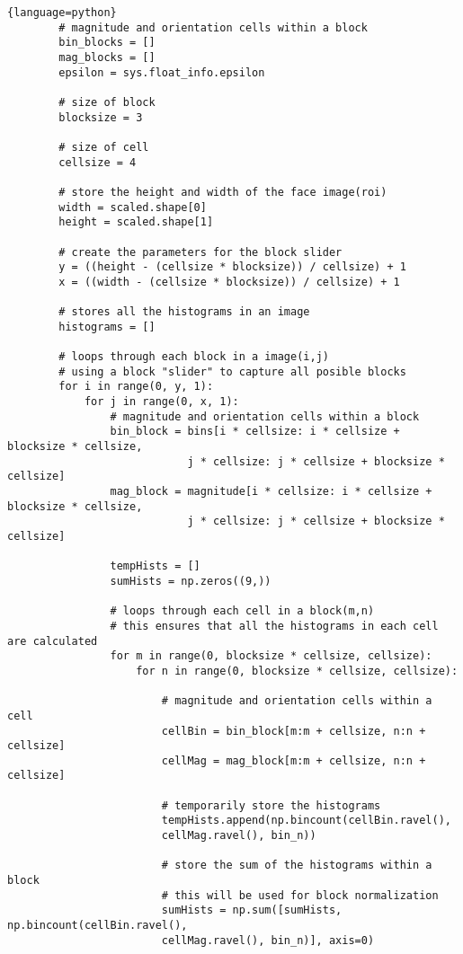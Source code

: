 \begin{lstlisting}{language=python}
        # magnitude and orientation cells within a block
        bin_blocks = []
        mag_blocks = []
        epsilon = sys.float_info.epsilon

        # size of block
        blocksize = 3 
		
        # size of cell
        cellsize = 4

        # store the height and width of the face image(roi)
        width = scaled.shape[0]
        height = scaled.shape[1]

        # create the parameters for the block slider
        y = ((height - (cellsize * blocksize)) / cellsize) + 1
        x = ((width - (cellsize * blocksize)) / cellsize) + 1

        # stores all the histograms in an image
        histograms = []
		
        # loops through each block in a image(i,j)
        # using a block "slider" to capture all posible blocks 
        for i in range(0, y, 1):  
            for j in range(0, x, 1):
                # magnitude and orientation cells within a block
                bin_block = bins[i * cellsize: i * cellsize + blocksize * cellsize,
                            j * cellsize: j * cellsize + blocksize * cellsize]
                mag_block = magnitude[i * cellsize: i * cellsize + blocksize * cellsize,
                            j * cellsize: j * cellsize + blocksize * cellsize]
							
                tempHists = []
                sumHists = np.zeros((9,))
				
                # loops through each cell in a block(m,n)
                # this ensures that all the histograms in each cell are calculated
                for m in range(0, blocksize * cellsize, cellsize): 
                    for n in range(0, blocksize * cellsize, cellsize):
					
                        # magnitude and orientation cells within a cell
                        cellBin = bin_block[m:m + cellsize, n:n + cellsize]
                        cellMag = mag_block[m:m + cellsize, n:n + cellsize]
						
                        # temporarily store the histograms
                        tempHists.append(np.bincount(cellBin.ravel(), 
                        cellMag.ravel(), bin_n))
						
                        # store the sum of the histograms within a block
                        # this will be used for block normalization
                        sumHists = np.sum([sumHists, np.bincount(cellBin.ravel(), 
                        cellMag.ravel(), bin_n)], axis=0)
						

\end{lstlisting}
